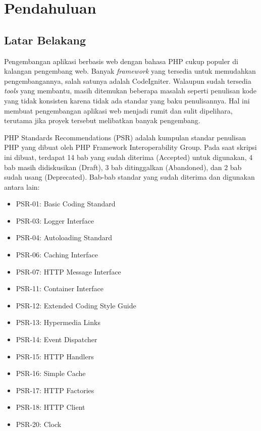 \chapter{Pendahuluan}
\label{chap:intro}
   
\section{Latar Belakang}
\label{sec:label}

Pengembangan aplikasi berbasis web dengan bahasa PHP cukup populer di kalangan pengembang web. Banyak \textit{framework} yang tersedia untuk memudahkan pengembangannya, salah satunya adalah CodeIgniter. Walaupun sudah tersedia \textit{tools} yang membantu, masih ditemukan beberapa masalah seperti penulisan kode yang tidak konsisten karena tidak ada standar yang baku penulisannya. Hal ini membuat pengembangan aplikasi web menjadi rumit dan sulit dipelihara, terutama jika proyek tersebut melibatkan banyak pengembang.

PHP Standards Recommendations \cite{PSR} (PSR) adalah kumpulan standar penulisan PHP yang dibuat oleh PHP Framework Interoperability Group. Pada saat skripsi ini dibuat, terdapat 14 bab yang sudah diterima (Accepted) untuk digunakan, 4 bab masih didiskusikan (Draft), 3 bab ditinggalkan (Abandoned), dan 2 bab sudah usang (Deprecated). Bab-bab standar yang sudah diterima dan digunakan antara lain: 
\begin{itemize}
	\item PSR-01: Basic Coding Standard
	\item PSR-03: Logger Interface
	\item PSR-04: Autoloading Standard
	\item PSR-06: Caching Interface
	\item PSR-07: HTTP Message Interface
	\item PSR-11: Container Interface
	\item PSR-12: Extended Coding Style Guide
	\item PSR-13: Hypermedia Links
	\item PSR-14: Event Dispatcher
	\item PSR-15: HTTP Handlers
	\item PSR-16: Simple Cache
	\item PSR-17: HTTP Factories
	\item PSR-18: HTTP Client
	\item PSR-20: Clock
\end{itemize}


